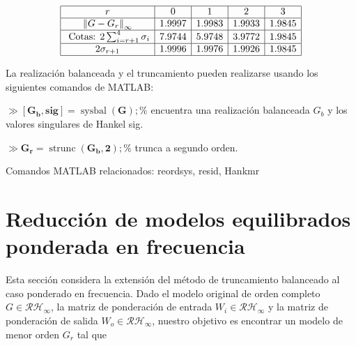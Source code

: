 
$$
\begin{array}{|c|c|c|c|c|}
\hline r & 0 & 1 & 2 & 3 \\
\hline\left\|G-G_r\right\|_{\infty} & 1.9997 & 1.9983 & 1.9933 & 1.9845 \\
\hline \text { Cotas: } 2 \sum_{i=r+1}^4 \sigma_i & 7.9744 & 5.9748 & 3.9772 & 1.9845 \\
\hline 2 \sigma_{r+1} & 1.9996 & 1.9976 & 1.9926 & 1.9845 \\
\hline
\end{array}
$$

La realización balanceada y el truncamiento pueden realizarse usando los siguientes comandos de MATLAB:

$\gg\left[\mathbf{G}_{\mathbf{b}}, \mathbf{s i g}\right]=\operatorname{sysbal}(\mathbf{G}) ; \%$ encuentra una realización balanceada $G_{b}$ y los valores singulares de Hankel sig.

$\gg \mathbf{G}_{\mathbf{r}}=\operatorname{strunc}\left(\mathbf{G}_{\mathbf{b}}, \mathbf{2}\right) ; \%$ trunca a segundo orden.

Comandos MATLAB relacionados: reordsys, resid, Hankmr

\section{Reducción de modelos equilibrados ponderada en frecuencia}
Esta sección considera la extensión del método de truncamiento balanceado al caso ponderado en frecuencia. Dado el modelo original de orden completo $G \in \mathcal{R} \mathcal{H}_{\infty}$, la matriz de ponderación de entrada $W_{i} \in \mathcal{R} \mathcal{H}_{\infty}$ y la matriz de ponderación de salida $W_{o} \in \mathcal{R} \mathcal{H}_{\infty}$, nuestro objetivo es encontrar un modelo de menor orden $G_{r}$ tal que

